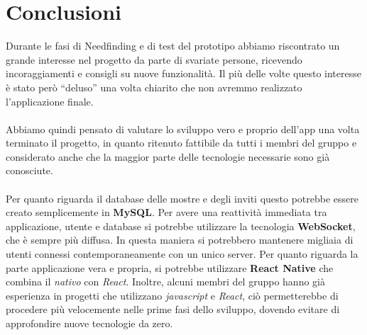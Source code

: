 \section{Conclusioni}

Durante le fasi di Needfinding e di test del prototipo abbiamo riscontrato un grande interesse nel progetto da parte di svariate persone, ricevendo incoraggiamenti e consigli su nuove funzionalità. Il più delle volte questo interesse è stato però ``deluso'' una volta chiarito che non avremmo realizzato l'applicazione finale.

\paragraph{}
Abbiamo quindi pensato di valutare lo sviluppo vero e proprio dell'app una volta terminato il progetto, in quanto ritenuto fattibile da tutti i membri del gruppo e considerato anche che la maggior parte delle tecnologie necessarie sono già conosciute.

\paragraph{}
Per quanto riguarda il database delle mostre e degli inviti questo potrebbe essere creato semplicemente in \textbf{MySQL}. Per avere una reattività immediata tra applicazione, utente e database si potrebbe utilizzare la tecnologia \textbf{WebSocket}, che è sempre più diffusa. In questa maniera si potrebbero mantenere migliaia di utenti connessi contemporaneamente con un unico server. Per quanto riguarda la parte applicazione vera e propria, si potrebbe utilizzare \textbf{React Native} che combina il \textit{nativo} con \textit{React}. Inoltre, alcuni membri del gruppo hanno già esperienza in progetti che utilizzano \textit{javascript} e \textit{React}, ciò permetterebbe di procedere più velocemente nelle prime fasi dello sviluppo, dovendo evitare di approfondire nuove tecnologie da zero.